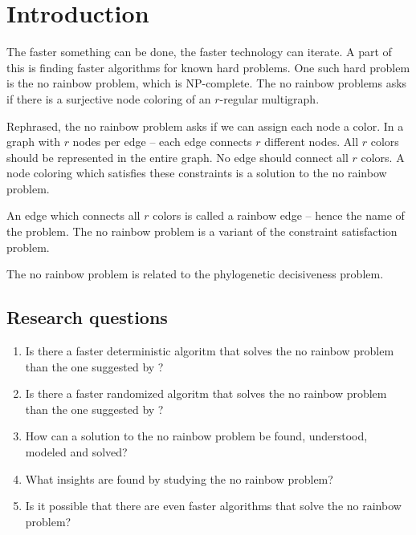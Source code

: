 \chapter{Introduction}
The faster something can be done, the faster technology can iterate.
A part of this is finding faster algorithms for known hard problems.
One such hard problem is the no rainbow problem, which is NP-complete\cite{sourceNoRainbow}.
The no rainbow problems asks if there is a surjective node coloring of an $r$-regular multigraph.

Rephrased, the no rainbow problem asks if we can assign each node a color.
In a graph with $r$ nodes per edge -- each edge connects $r$ different nodes.
All $r$ colors should be represented in the entire graph.
No edge should connect all $r$ colors.
A node coloring which satisfies these constraints is a solution to the no rainbow problem.

An edge which connects all $r$ colors is called a rainbow edge -- hence the name of the problem.
The no rainbow problem is a variant of the constraint satisfaction problem.

The no rainbow problem is related to the phylogenetic decisiveness problem. \cite{sourcePhylogeneticDecisiveness}


\section{Research questions}
\begin{enumerate}
  \item Is there a faster deterministic algoritm that solves the no rainbow problem than the one suggested by \cite{sourceNoRainbow}?
  \item Is there a faster randomized algoritm that solves the no rainbow problem than the one suggested by \cite{sourceNoRainbow}?
  \item How can a solution to the no rainbow problem be found, understood, modeled and solved?
  \item What insights are found by studying the no rainbow problem?
  \item Is it possible that there are even faster algorithms that solve the no rainbow problem?
\end{enumerate}
